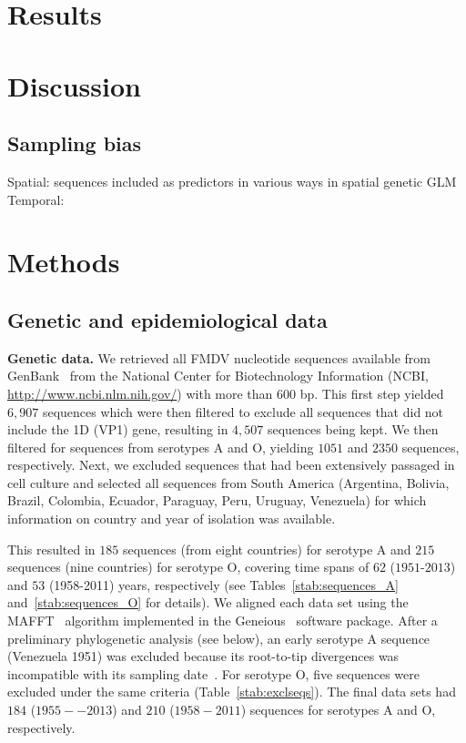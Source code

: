 \documentclass[10pt]{article}
\begin{document}
\section*{Results}

\section*{Discussion}

\subsection*{Sampling bias}
Spatial: sequences included as predictors in various ways in spatial genetic GLM
Temporal: 

\section*{Methods}
\subsection*{Genetic and epidemiological data}

\textbf{Genetic data.}
We retrieved all FMDV nucleotide sequences available from GenBank~\citep{Benson2013} from the National Center for Biotechnology Information (NCBI, \url{ http://www.ncbi.nlm.nih.gov/}) with more than $600$ bp.
This first step yielded $6, 907$ sequences which were then filtered to exclude all sequences that did not include the 1D (VP1) gene, resulting in $4, 507$ sequences being kept.
We then filtered for sequences from serotypes A and O, yielding $1051$ and $2350$ sequences, respectively.
Next, we excluded sequences that had been extensively passaged in cell culture and selected all sequences from South America (Argentina, Bolivia, Brazil, Colombia, Ecuador, Paraguay, Peru, Uruguay, Venezuela) for which information on country and year of isolation was available.

This resulted in $185$ sequences (from eight countries) for serotype A and $215$ sequences (nine countries) for serotype O, covering time spans of $62$ ($1951$-$2013$) and $53$ (1958-2011) years, respectively (see Tables~\ref{stab:sequences_A} and~\ref{stab:sequences_O} for details).
We aligned each data set using the MAFFT~\citep{Katoh2002} algorithm implemented in the Geneious~\citep{Kearse2012} software package.
After a preliminary phylogenetic analysis (see below), an early serotype A sequence (Venezuela 1951) was excluded because its root-to-tip divergences was incompatible with its sampling date~\citep{Rambaut2016}.
For serotype O, five sequences were excluded under the same criteria (Table~\ref{stab:exclseqs}).
The final data sets had $184$ ($1955 -- 2013$) and $210$ ($1958-2011$) sequences for serotypes A and O, respectively.
\end{document}
